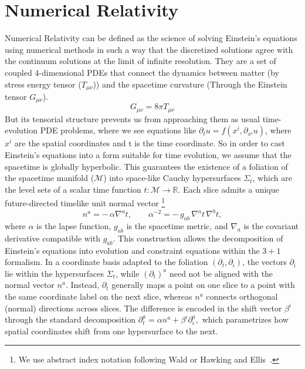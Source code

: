 \section{Numerical Relativity}
\label{NR}
Numerical Relativity can be defined as the science of solving Einstein's equations using numerical methods in such a way that the discretized solutions agree with the continuum solutions at the limit of infinite resolution. They are a set of coupled 4-dimensional PDEs that connect the dynamics between matter (by stress energy tensor ($T_{\mu \nu}$)) and the spacetime curvature (Through the Einstein tensor $G_{\mu \nu}$).
$$
G_{\mu \nu}=8 \pi T_{\mu \nu}
$$
But its tensorial structure prevents us from approaching them as usual time-evolution PDE problems, where we see equations like $\partial_t u = f(x^i, \partial_{x^i} u)$, where $x^i$ are the spatial coordinates and t is the time coordinate. So in order to cast Einstein's equations into a form suitable for time evolution, we assume 
that the spacetime is globally hyperbolic. This guarantees the existence of a
foliation of the spacetime manifold ($\mathcal{M}$) into space-like Cauchy hypersurfaces $\Sigma_t$, which are the level 
sets of a scalar time function $t : \mathcal{M} \to \mathbb{R}$. Each slice 
admits a unique future-directed timelike unit normal vector \footnote{We use 
abstract index notation following Wald \cite{wald} or Hawking and Ellis~\cite{hawkingellis}.} 
\[
n^a = -\,\alpha \nabla^a t, \qquad 
\alpha^{-2} = -\,g_{ab}\, \nabla^a t\, \nabla^b t,
\]
where $\alpha$ is the lapse function, $g_{ab}$ is the spacetime metric, and 
$\nabla_a$ is the covariant derivative compatible with $g_{ab}$. This 
construction allows the decomposition of Einstein's equations into evolution and 
constraint equations within the $3+1$ formalism. In a coordinate basis adapted 
to the foliation $(\partial_t,\partial_i)$, the vectors $\partial_i$ lie within 
the hypersurfaces $\Sigma_t$, while $(\partial_t)^a$ need not be aligned with the 
normal vector $n^a$. Instead, $\partial_t$ generally maps a point on one slice 
to a point with the same coordinate label on the next slice, whereas $n^a$ 
connects orthogonal (normal) directions across slices. The difference is encoded 
in the shift vector $\beta^i$ through the standard decomposition $\partial_t^a = \alpha n^a + \beta^i \partial_i^a,$ which parametrizes how spatial coordinates shift from one hypersurface to the 
next.
